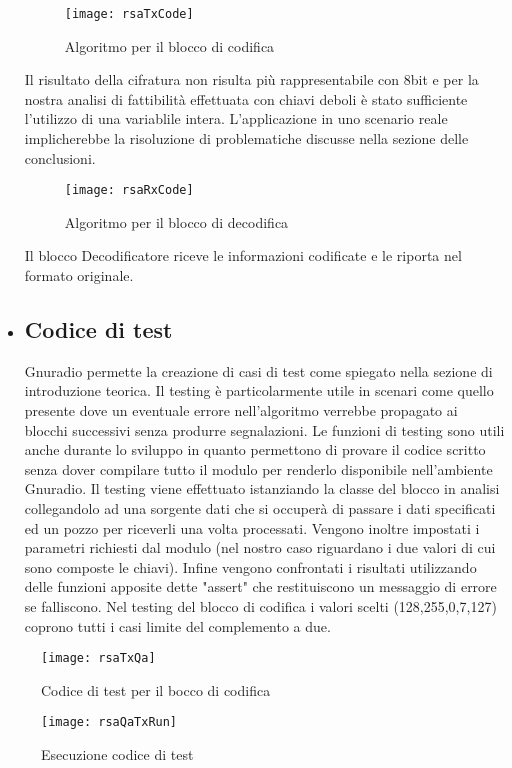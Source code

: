 \begin{itemize}
\begin{figure}[h]
	\texttt{[image: rsaTxCode]}
	\caption{Algoritmo per il blocco di codifica}
\end{figure}
Il risultato della cifratura non risulta più rappresentabile con 8bit e per la nostra analisi di fattibilità effettuata con chiavi deboli è stato sufficiente l'utilizzo di una variablile intera. L'applicazione in uno scenario reale implicherebbe la risoluzione di problematiche discusse nella sezione delle conclusioni.
\begin{figure}[h]
	\raggedleft
	\texttt{[image: rsaRxCode]}
	\caption{Algoritmo per il blocco di decodifica}
\end{figure}
Il blocco Decodificatore riceve le informazioni codificate e le riporta nel formato originale.
\item \subsection{Codice di test}
Gnuradio permette la creazione di casi di test come spiegato nella sezione di introduzione teorica. Il testing è particolarmente utile in scenari come quello presente dove un eventuale errore nell'algoritmo verrebbe propagato ai blocchi successivi senza produrre segnalazioni. Le funzioni di testing sono utili anche durante lo sviluppo in quanto permettono di provare il codice scritto senza dover compilare tutto il modulo per renderlo disponibile nell'ambiente Gnuradio. Il testing viene effettuato istanziando la classe del blocco in analisi collegandolo ad una sorgente dati che si occuperà di passare i dati specificati ed un pozzo per riceverli una volta processati. Vengono inoltre impostati i parametri richiesti dal modulo (nel nostro caso riguardano i due valori di cui sono composte le chiavi). Infine vengono confrontati i risultati utilizzando delle funzioni apposite dette "assert" che restituiscono un messaggio di errore se falliscono.
Nel testing del blocco di codifica i valori scelti (128,255,0,7,127) coprono tutti i casi limite del complemento a due.
\end{itemize}
\begin{figure}[h]
	\centering
	\texttt{[image: rsaTxQa]}
	\caption{Codice di test per il bocco di codifica}
\end{figure}
\begin{figure}[h]
	\centering
	\texttt{[image: rsaQaTxRun]}
	\caption{Esecuzione codice di test}
\end{figure}
